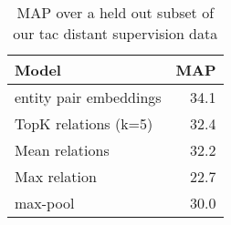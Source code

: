 %

\begin{table}[h!]
\setlength{\tabcolsep}{4.1pt}
\begin{center}
\begin{tabular}{|lr|}
\hline
\bf Model & MAP \\
\hline\hline
entity pair embeddings      & 34.1 \\
\hline
TopK relations (k=5)       & 32.4  \\
Mean relations              & 32.2 \\
Max relation                & 22.7  \\
max-pool                    & 30.0 \\
\hline

\hline
\end{tabular}
\caption{MAP over a held out subset of our tac distant supervision data
\label{distant-supervision-table}}
\end{center}
\vspace{-.3cm}
\end{table}


%
